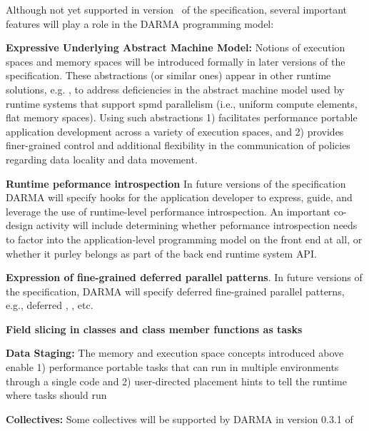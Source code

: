 Although not yet supported in version \specVersion\ of the specification, several
important features will play a role in the \gls{DARMA} \gls{programming model}:
\begin{compactdesc}
\item{\bf Expressive Underlying Abstract Machine Model:}
Notions of \glspl{execution space} and \glspl{memory space} will be introduced
formally in later
versions of the specification.  These abstractions (or similar ones) appear in other runtime
solutions, e.g. \cite{Kokkos, RAJA}, to
  address deficiencies in the \gls{abstract machine model} used by 
  \glspl{runtime system} that support \gls{spmd} parallelism (i.e., uniform compute elements, flat memory
    spaces).  Using such abstractions
1) facilitates performance portable application development across 
  a variety of \glspl{execution space}, and 2)
  provides finer-grained control and additional flexibility in the
  communication of policies regarding data locality and data movement. 
\item{\bf Runtime peformance introspection}
  In future versions of the specification \gls{DARMA} will specify hooks for the
  application developer to express, guide, and leverage the use of runtime-level
  performance \gls{introspection}. An important \gls{co-design} activity will include determining
  whether peformance \gls{introspection} needs to factor into the
  application-level \gls{programming
  model} on the \gls{front end} at all, or whether it purley belongs as part of the  \gls{back end}
  \gls{runtime system} \gls{API}.
\item{\bf Expression of fine-grained deferred parallel patterns}.
  In future versions of the specification, \gls{DARMA} will 
  specify deferred fine-grained parallel patterns, e.g., deferred
  , , etc.
\item{\bf Field slicing in classes and class member functions as tasks}
\item {\bf Data Staging:}
The memory and execution space concepts introduced above enable 1) performance portable tasks that can run in 
multiple environments through a single code and 2) user-directed placement hints to tell the runtime where tasks should run
\item {\bf Collectives:}
  Some collectives will be supported by \gls{DARMA} in version 0.3.1 of

\end{compactdesc}
